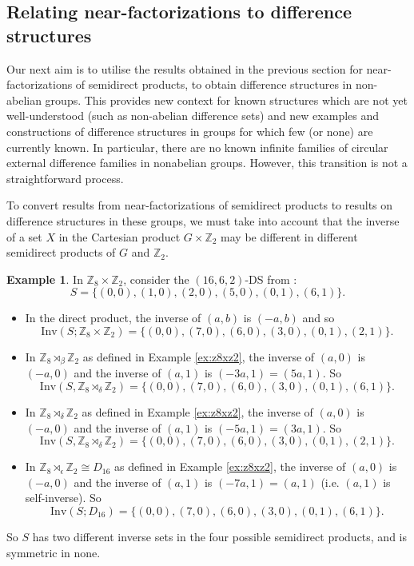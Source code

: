 \documentclass[12pt, a4paper]{article}
\theoremstyle{definition}
\newtheorem{example}[theorem]{Example}
\begin{document}
\subsection{Relating near-factorizations to difference structures}

Our next aim is to utilise the results obtained in the previous section for near-factorizations of semidirect products, to obtain difference structures in non-abelian groups.  This provides new context for known structures which are not yet well-understood (such as non-abelian difference sets) and new examples and constructions of difference structures in groups for which few (or none) are currently known.  In particular, there are no known infinite families of circular external difference families in nonabelian groups.  However, this transition is not a straightforward process.

To convert results from near-factorizations of semidirect products to results on difference structures in these groups, we must take into account that the inverse of a set $X$ in the Cartesian product $G \times \mathbb{Z}_2$ may be different in different semidirect products of $G$ and $\mathbb{Z}_2$. 


\begin{example}\label{ex:inverses}
In  $\mathbb{Z}_8 \times \mathbb{Z}_2$, consider the $(16,6,2)$-DS from \cite{KreLiSti}: 
$$S=\{(0,0),(1,0),(2,0),(5,0),(0,1),(6,1)\}.$$
\begin{itemize}
\item In the direct product, the inverse of $(a,b)$ is $(-a,b)$ and so
$$\mathrm{Inv}(S;\mathbb{Z}_8 \times \mathbb{Z}_2)=\{(0,0),(7,0),(6,0),(3,0),(0,1),(2,1)\}.$$
\item In $\mathbb{Z}_8 \rtimes_{\beta} \mathbb{Z}_2$ as defined in Example \ref{ex:z8xz2}, the inverse of $(a,0)$ is $(-a,0)$ and the inverse of $(a,1)$ is $(-3a,1)=(5a,1)$. So
$$\mathrm{Inv}(S,\mathbb{Z}_8 \rtimes_{\delta} \mathbb{Z}_2)=\{(0,0),(7,0),(6,0),(3,0),(0,1),(6,1)\}.$$ 
\item In $\mathbb{Z}_8 \rtimes_{\delta} \mathbb{Z}_2$ as defined in Example \ref{ex:z8xz2}, the inverse of $(a,0)$ is $(-a,0)$ and the inverse of $(a,1)$ is $(-5a,1)=(3a,1)$. So
$$\mathrm{Inv}(S,\mathbb{Z}_8 \rtimes_{\delta} \mathbb{Z}_2)=\{(0,0),(7,0),(6,0),(3,0),(0,1),(2,1)\}.$$ 
\item In $\mathbb{Z}_8 \rtimes_{\epsilon} \mathbb{Z}_2 \cong D_{16}$ as defined in Example \ref{ex:z8xz2}, the inverse of $(a,0)$ is $(-a,0)$ and the inverse of $(a,1)$ is $(-7a,1)=(a,1)$ (i.e. $(a,1)$ is self-inverse). 
So 
$$\mathrm{Inv}(S; D_{16})=\{(0,0),(7,0),(6,0),(3,0),(0,1),(6,1)\}.$$ 
\end{itemize}
So $S$ has two different inverse sets in the four possible semidirect products, and is symmetric in none.
\end{example}
\end{document}
